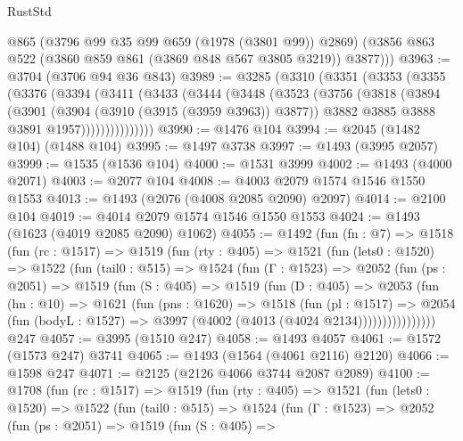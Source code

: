 \begin{lexlean}{RustStd}
\begin{coremodule}
        @865
        (@3796 @99 @35 @99 @659 (@1978 (@3801 @99)) @2869)
        (@3856 @863 @522 (@3860 @859 @861 (@3869 @848 @567 @3805 @3219)) @3877)))
@3963 := @3704 (@3706 @94 @36 @843)
@3989 := @3285
    (@3310
      (@3351
        (@3353
          (@3355
            (@3376
              (@3394
                (@3411
                  (@3433
                    (@3444
                      (@3448
                        (@3523
                          (@3756
                            (@3818
                              (@3894
                                (@3901
                                  (@3904 (@3910 (@3915 (@3959 @3963)) @3877))
                                  @3882
                                  @3885
                                  @3888
                                  @3891
                                  @1957)))))))))))))))
@3990 := @1476 @104
@3994 := @2045 (@1482 @104) (@1488 @104)
@3995 := @1497 @3738
@3997 := @1493 (@3995 @2057)
@3999 := @1535 (@1536 @104)
@4000 := @1531 @3999
@4002 := @1493 (@4000 @2071)
@4003 := @2077 @104
@4008 := @4003 @2079 @1574 @1546 @1550 @1553
@4013 := @1493 (@2076 (@4008 @2085 @2090) @2097)
@4014 := @2100 @104
@4019 := @4014 @2079 @1574 @1546 @1550 @1553
@4024 := @1493 (@1623 (@4019 @2085 @2090) @1062)
@4055 := @1492
    (fun (fn : @7) =>
    @1518
      (fun (rc : @1517) =>
      @1519
        (fun (rty : @405) =>
        @1521
          (fun (lets0 : @1520) =>
          @1522
            (fun (tail0 : @515) =>
            @1524
              (fun (Γ : @1523) =>
              @2052
                (fun (ps : @2051) =>
                @1519
                  (fun (S : @405) =>
                  @1519
                    (fun (D : @405) =>
                    @2053
                      (fun (hn : @10) =>
                      @1621
                        (fun (pns : @1620) =>
                        @1518
                          (fun (pl : @1517) =>
                          @2054
                            (fun (bodyL : @1527) => @3997 (@4002 (@4013 (@4024 @2134))))))))))))))))
    @247
@4057 := @3995 (@1510 @247)
@4058 := @1493 @4057
@4061 := @1572 (@1573 @247) @3741
@4065 := @1493 (@1564 (@4061 @2116) @2120)
@4066 := @1598 @247
@4071 := @2125 (@2126 @4066 @3744 @2087 @2089)
@4100 := @1708
    (fun (rc : @1517) =>
    @1519
      (fun (rty : @405) =>
      @1521
        (fun (lets0 : @1520) =>
        @1522
          (fun (tail0 : @515) =>
          @1524
            (fun (Γ : @1523) =>
            @2052
              (fun (ps : @2051) =>
              @1519
                (fun (S : @405) =>

\end{coremodule}
\end{lexlean}
